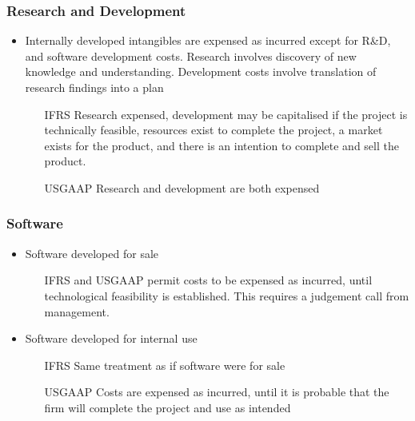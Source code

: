\documentclass[../notes_compiled.tex]{subfiles}
\begin{document}
\subsubsection{Research and Development}
\label{randd}
\begin{itemize}
\item Internally developed intangibles are expensed as incurred except for R\&D, and software development costs. Research involves discovery of new knowledge and understanding. Development costs involve translation of research findings into a plan
\begin{itemize}
\item[IFRS] Research expensed, development may be capitalised if the project is technically feasible, resources exist to complete the project, a market exists for the product, and there is an intention to complete and sell the product.
\item[USGAAP] Research and development are both expensed
\end{itemize}
\end{itemize}

\subsubsection{Software}
\label{software}
\begin{itemize}
\item Software developed for sale
\begin{itemize}
\item[IFRS] and USGAAP permit costs to be expensed as incurred, until technological feasibility is established. This requires a judgement call from management.
\end{itemize}

\item Software developed for internal use
\begin{itemize}
\item[IFRS] Same treatment as if software were for sale
\item[USGAAP] Costs are expensed as incurred, until it is probable that the firm will complete the project and use as intended
\end{itemize}
\end{itemize}
\end{document}
